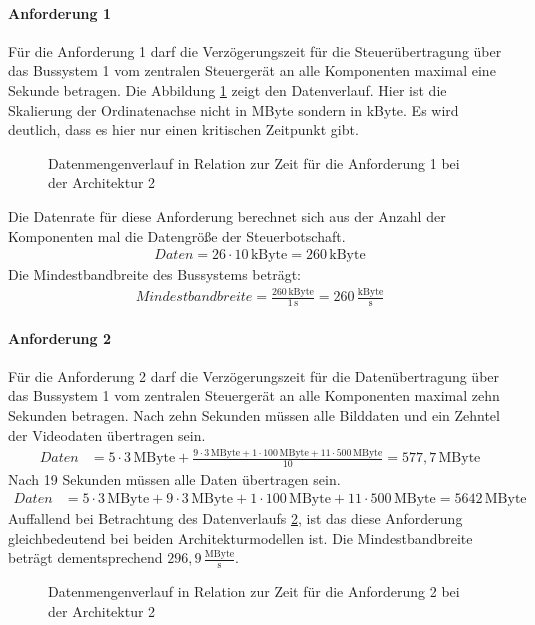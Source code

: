 \paragraph{Anforderung 1}
Für die Anforderung 1 darf die Verzögerungszeit für die Steuerübertragung über das Bussystem 1 vom zentralen Steuergerät an alle Komponenten maximal eine Sekunde betragen. Die Abbildung \ref{fig:arch2anf1} zeigt den Datenverlauf. Hier ist die Skalierung der Ordinatenachse nicht in MByte sondern in kByte. Es wird deutlich, dass es hier nur einen kritischen Zeitpunkt gibt.
\begin{figure}[]
	\centering
	
	\caption[Datenmengenverlauf in Relation zur Zeit für die Anforderung 1 bei der Architektur 2]{Datenmengenverlauf in Relation zur Zeit für die Anforderung 1 bei der Architektur 2}
	\label{fig:arch2anf1}
\end{figure}
Die Datenrate für diese Anforderung berechnet sich aus der Anzahl der Komponenten mal die Datengröße der Steuerbotschaft.
\begin{align}
	Daten = 26 \cdot 10\,\mathrm{kByte} = 260\,\mathrm{kByte}
\end{align}
Die Mindestbandbreite des Bussystems beträgt:
\begin{align}
	Mindestbandbreite = \frac{260\,\mathrm{kByte}}{1\,\mathrm{s}} = 260\,\frac{\mathrm{kByte}}{\mathrm{s}}
\end{align}
\paragraph{Anforderung 2}
Für die Anforderung 2 darf die Verzögerungszeit für die Datenübertragung über das Bussystem 1 vom zentralen Steuergerät an alle Komponenten maximal zehn Sekunden betragen.
Nach zehn Sekunden müssen alle Bilddaten und ein Zehntel der Videodaten übertragen sein.
\begin{align}
	Daten &= 5 \cdot 3\,\mathrm{MByte} + \frac{9 \cdot 3 \,\mathrm{MByte} + 1 \cdot 100\,\mathrm{MByte} + 11 \cdot 500\,\mathrm{MByte}}{10} =  577,7\,\mathrm{MByte}
\end{align}
Nach 19 Sekunden müssen alle Daten übertragen sein.
\begin{align}
	Daten &= 5 \cdot 3\,\mathrm{MByte} + 9 \cdot 3 \,\mathrm{MByte} + 1 \cdot 100\,\mathrm{MByte} + 11 \cdot 500\,\mathrm{MByte} =  5642\,\mathrm{MByte}
\end{align}
Auffallend bei Betrachtung des Datenverlaufs \ref{fig:arch2anf2}, ist das diese Anforderung gleichbedeutend bei beiden Architekturmodellen ist. Die Mindestbandbreite beträgt dementsprechend $ 296,9\,\frac{\mathrm{MByte}}{\mathrm{s}} $.
\begin{figure}[]
	\centering
	
	\caption[Datenmengenverlauf in Relation zur Zeit für die Anforderung 2 bei der Architektur 2]{Datenmengenverlauf in Relation zur Zeit für die Anforderung 2 bei der Architektur 2}
	\label{fig:arch2anf2}
\end{figure}
